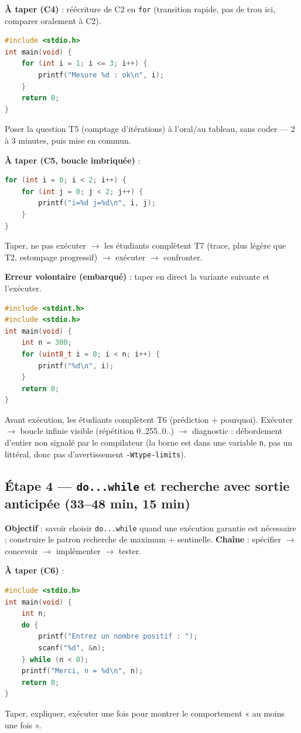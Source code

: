 \documentclass[cours, noCustomPackages]{UPSTI_Document}
\begin{document}
\textbf{À taper (C4)} : réécriture de C2 en \texttt{for} (transition rapide,
pas de trou ici, comparer oralement à C2).
\begin{lstlisting}[language=c]
#include <stdio.h>
int main(void) {
    for (int i = 1; i <= 3; i++) {
        printf("Mesure %d : ok\n", i);
    }
    return 0;
}
\end{lstlisting}

Poser la question T5 (comptage d'itérations) à l'oral/au tableau, sans coder
--- 2 à 3 minutes, puis mise en commun.

\TrouCinq

\textbf{À taper (C5, boucle imbriquée)} :
\begin{lstlisting}[language=c]
for (int i = 0; i < 2; i++) {
    for (int j = 0; j < 2; j++) {
        printf("i=%d j=%d\n", i, j);
    }
}
\end{lstlisting}
Taper, ne pas exécuter $\to$ les étudiants complètent T7 (trace, plus légère
que T2, estompage progressif) $\to$ exécuter $\to$ confronter.

\TableTraceCCinq

\textbf{Erreur volontaire (embarqué)} : taper en direct la variante suivante
et l'exécuter.
\begin{lstlisting}[language=c]
#include <stdint.h>
#include <stdio.h>
int main(void) {
    int n = 300;
    for (uint8_t i = 0; i < n; i++) {
        printf("%d\n", i);
    }
    return 0;
}
\end{lstlisting}
Avant exécution, les étudiants complètent T6 (prédiction + pourquoi).
Exécuter $\to$ boucle infinie visible (répétition 0..255..0..) $\to$
diagnostic : débordement d'entier non signalé par le compilateur (la borne
est dans une variable \texttt{n}, pas un littéral, donc pas d'avertissement
\texttt{-Wtype-limits}).

\TrouSix

\subsection*{Étape 4 --- \texttt{do...while} et recherche avec sortie anticipée (33--48 min, 15 min)}

\textbf{Objectif} : savoir choisir \texttt{do...while} quand une exécution
garantie est nécessaire ; construire le patron recherche de maximum +
sentinelle. \textbf{Chaîne} : spécifier $\to$ concevoir $\to$ implémenter
$\to$ tester.

\textbf{À taper (C6)} :
\begin{lstlisting}[language=c]
#include <stdio.h>
int main(void) {
    int n;
    do {
        printf("Entrez un nombre positif : ");
        scanf("%d", &n);
    } while (n < 0);
    printf("Merci, n = %d\n", n);
    return 0;
}
\end{lstlisting}
Taper, expliquer, exécuter une fois pour montrer le comportement « au moins
une fois ».
\end{document}

